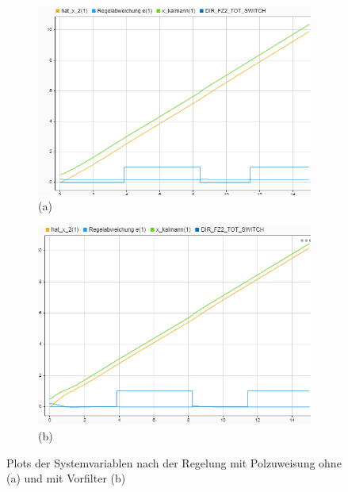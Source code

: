 \begin{figure}[hbt]
\centering
\begin{subfigure}{0.49\textwidth}
    \centering
    \includegraphics*[width=\textwidth]{figures/polzuw_raw.png}\\
    (a)
\end{subfigure}
\begin{subfigure}{0.49\textwidth}
    \centering
    \includegraphics*[width=\textwidth]{figures/polzuw_off.png}\\
    (b)
\end{subfigure}
    \caption{Plots der Systemvariablen nach der Regelung mit Polzuweisung ohne
        (a) und mit Vorfilter (b)
    \label{fig:polplot}}
\end{figure}    


